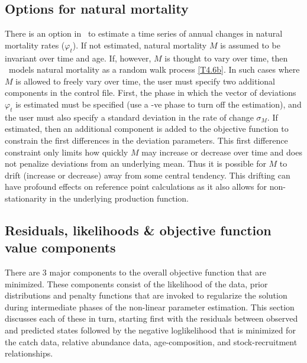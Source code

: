 		\subsection{Options for natural mortality}
		
There is an option in \iscam\ to estimate a time series of annual changes in natural mortality rates ($\varphi_t$).  If not estimated, natural mortality $M$ is assumed to be invariant over time and age.  If, however, $M$ is thought to vary over time, then \iscam\ models natural mortality as a random walk process \eqref{T4.6b}.  In such cases where $M$ is allowed to freely vary over time, the user must specify two additional components in the control file. First, the phase in which the vector of deviations $\varphi_t$ is estimated must be specified (use a -ve phase to turn off the estimation), and the user must also specify a standard deviation in the rate of change $\sigma_M$.  If estimated, then an additional component is added to the objective function to constrain the first differences in the deviation parameters.  This first difference constraint only limits how quickly $M$ may increase or decrease over time and does not penalize deviations from an underlying mean.  Thus it is possible for $M$ to drift (increase or decrease) away from some central tendency. This drifting can have profound effects on reference point calculations as it also allows for non-stationarity in the underlying production function.


		
		\subsection{Residuals, likelihoods \& objective function value components}\label{secLikelihoods}

There are 3 major components to the overall objective function that are minimized.  These components consist of the likelihood of the data, prior distributions and penalty functions that are invoked to regularize the solution during intermediate phases of the non-linear parameter estimation.  This section discusses each of these in turn, starting first with the residuals between observed and predicted states followed by the negative loglikelihood that is minimized for the catch data, relative abundance data, age-composition, and stock-recruitment relationships.

